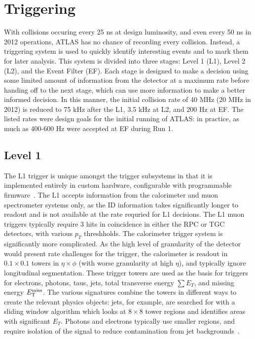 \section{Triggering}

With collisions occuring every 25 ns at design luminosity, and even every 50 ns in 2012 operations, ATLAS has no chance of recording every collision. Instead, a triggering system is used to quickly identify interesting events and to mark them for later analysis\cite{ATLASPaper,Trigger2010}. This system is divided into three stages: Level 1 (L1), Level 2 (L2), and the Event Filter (EF). Each stage is designed to make a decision using some limited amount of information from the detector at a maximum rate before handing off to the next stage, which can use more information to make a better informed decision. In this manner, the initial collision rate of 40 MHz (20 MHz in 2012) is reduced to 75 kHz after the L1, 3.5 kHz at L2, and 200 Hz at EF. The listed rates were design goals for the initial running of ATLAS: in practice, as much as 400-600 Hz were accepted at EF during Run 1.

\subsection{Level 1}

The L1 trigger is unique amongst the trigger subsystems in that it is implemented entirely in custom hardware, configurable with programmable firmware~\cite{ATLASPaper,Trigger2010}. The L1 accepts information from the calorimeter and muon spectrometer systems only, as the ID information takes significantly longer to readout and is not available at the rate requried for L1 decisions.  The L1 muon triggers typically require 3 hits in coincidence in either the RPC or TGC detectors, with various $p_T$ threshholds. The calorimeter trigger system is significantly more complicated. As the high level of granularity of the detector would present rate challenges for the trigger, the calorimeter is readout in $0.1\times0.1$ towers in $\eta \times \phi$ (with worse granularity at high $\eta$), and typically ignore longitudinal segmentation. These trigger towers are used as the basis for triggers for electrons, photons, taus, jets, total transverse energy $\sum E_T$, and missing energy $E_{\mathrm{T}}^{\text{miss}}$. The various signatures combine the towers in different ways to create the relevant physics objects: jets, for example, are searched for with a sliding window algorithm which looks at $8\times 8$ tower regions and identifies areas with significant $E_T$. Photons and electrons typically use smaller regions, and require isolation of the signal to reduce contamination from jet backgrounds~\cite{Trigger2010}.

